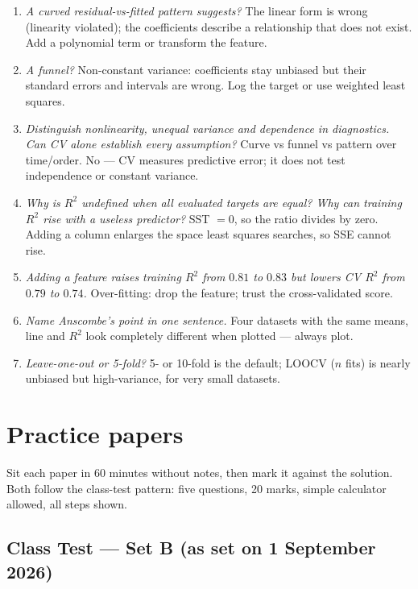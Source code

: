 \documentclass[11pt]{article}
\begin{document}
\begin{concept}
\begin{enumerate}[label=\textbf{C21.\arabic*}]
  \item \emph{A curved residual-vs-fitted pattern suggests?} The linear form
    is wrong (linearity violated); the coefficients describe a relationship
    that does not exist. Add a polynomial term or transform the feature.
  \item \emph{A funnel?} Non-constant variance: coefficients stay unbiased but
    their standard errors and intervals are wrong. Log the target or use
    weighted least squares.
  \item \emph{Distinguish nonlinearity, unequal variance and dependence in
    diagnostics. Can CV alone establish every assumption?} Curve vs funnel vs
    pattern over time/order. No --- CV measures predictive error; it does not
    test independence or constant variance.
  \item \emph{Why is $R^2$ undefined when all evaluated targets are equal? Why
    can training $R^2$ rise with a useless predictor?} SST $= 0$, so the ratio
    divides by zero. Adding a column enlarges the space least squares
    searches, so SSE cannot rise.
  \item \emph{Adding a feature raises training $R^2$ from $0.81$ to $0.83$
    but lowers CV $R^2$ from $0.79$ to $0.74$.} Over-fitting: drop the
    feature; trust the cross-validated score.
  \item \emph{Name Anscombe's point in one sentence.} Four datasets with the
    same means, line and $R^2$ look completely different when plotted ---
    always plot.
  \item \emph{Leave-one-out or 5-fold?} 5- or 10-fold is the default; LOOCV
    ($n$ fits) is nearly unbiased but high-variance, for very small datasets.
\end{enumerate}
\end{concept}
\section{Practice papers}
\label{sec:papers}

Sit each paper in 60 minutes without notes, then mark it against the
solution. Both follow the class-test pattern: five questions, 20 marks,
simple calculator allowed, all steps shown.

\subsection*{Class Test --- Set B \quad (as set on 1 September 2026)}
\end{document}

